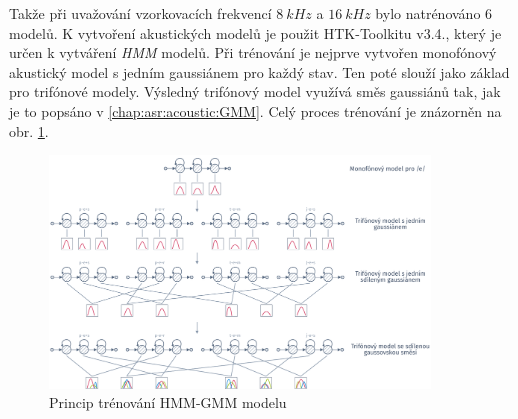 
Takže při uvažování vzorkovacích frekvencí $8\ kHz$ a $16\ kHz$ bylo natrénováno $6$ modelů. K vytvoření akustických modelů je použit HTK-Toolkitu v3.4., který je určen k vytváření \textit{HMM} modelů. Při trénování je nejprve vytvořen monofónový akustický model s jedním gaussiánem pro každý stav. Ten poté slouží jako základ pro trifónové modely. Výsledný trifónový model využívá směs gaussiánů tak, jak je to popsáno v \ref{chap:asr:acoustic:GMM}. Celý proces trénování je znázorněn na obr. \ref{fig:construction:results:baseline:hmm:training}.

\begin{figure}[hbpt]
  \centering
  \includegraphics[width=0.9\textwidth]{./ch5-construction/img/hmm-training.pdf}
  \caption{Princip trénování HMM-GMM modelu}
  \label{fig:construction:results:baseline:hmm:training}
\end{figure}

